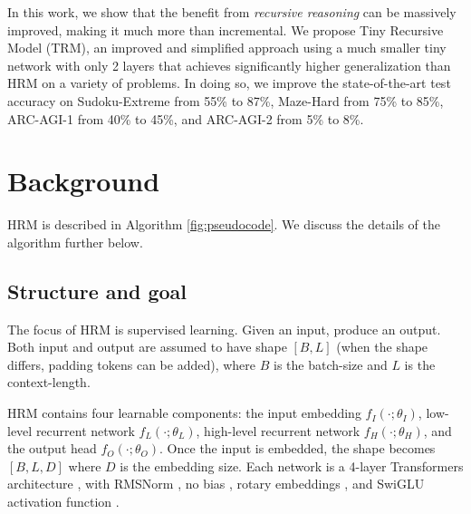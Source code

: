 \documentclass{article}
\theoremstyle{plain}
\theoremstyle{definition}
\theoremstyle{remark}
\begin{document}
In this work, we show that the benefit from \emph{recursive reasoning} can be massively improved, making it much more than incremental. We propose Tiny Recursive Model (TRM), an improved and simplified approach using a much smaller tiny network with only 2 layers that achieves significantly higher generalization than HRM on a variety of problems. In doing so, we improve the state-of-the-art test accuracy on Sudoku-Extreme from 55\% to 87\%, Maze-Hard from 75\% to 85\%, ARC-AGI-1 from 40\% to 45\%, and ARC-AGI-2 from 5\% to 8\%.

\section{Background}

HRM is described in Algorithm \ref{fig:pseudocode}. We discuss the details of the algorithm further below.

\subsection{Structure and goal}

The focus of HRM is supervised learning. Given an input, produce an output. Both input and output are assumed to have shape $[B,L]$ (when the shape differs, padding tokens can be added), where $B$ is the batch-size and $L$ is the context-length.

HRM contains four learnable components: the input embedding $f_I(\cdot; \theta_I)$, low-level recurrent network $f_L(\cdot; \theta_L)$, high-level recurrent network $f_H(\cdot; \theta_H)$, and the output head $f_O(\cdot; \theta_O)$. Once the input is embedded, the shape becomes $[B,L,D]$ where $D$ is the embedding size. Each network is a 4-layer Transformers architecture \citep{vaswani2017attention}, with RMSNorm \citep{zhang2019root}, no bias \citep{chowdhery2023palm}, rotary embeddings \citep{su2024roformer}, and SwiGLU activation function \citep{hendrycks2016gaussian, shazeer2020glu}.
\end{document}
